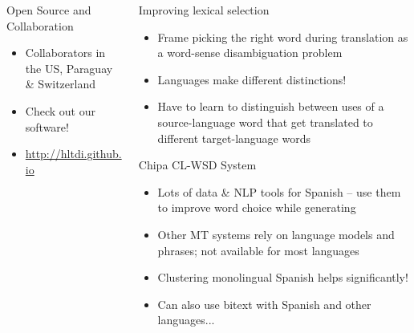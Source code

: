 \documentclass[final]{beamer}
\begin{document}
\begin{frame}{}
\begin{columns}[t]
\begin{column}{.32\linewidth}
  \begin{block}{\large Open Source and Collaboration}
    \centering
    \begin{itemize}
    \item Collaborators in the US, Paraguay \& Switzerland
    \item Check out our software!
    \item \url{http://hltdi.github.io}
    \end{itemize}
  \end{block}


  \end{column}


  \begin{column}{.32\linewidth}
  \vfill
  \begin{block}{\large Improving lexical selection}
    \begin{itemize}
    \item Frame picking the right word during translation as a word-sense disambiguation problem
    \item Languages make different distinctions!
    \item Have to learn to distinguish between uses of a source-language word
    that get translated to different target-language words
    \end{itemize}
  \end{block}

  \begin{block}{\large Chipa CL-WSD System}
    \begin{itemize}
    \item Lots of data \& NLP tools for Spanish -- use them
    to improve word choice while generating 
    \item Other MT systems rely on language models and phrases; not available
    for most languages
    \item Clustering monolingual Spanish helps significantly!
    \item Can also use bitext with Spanish and other languages...
    \end{itemize}
  \end{block}



\end{column}
\end{columns}
\end{frame}
\end{document}
